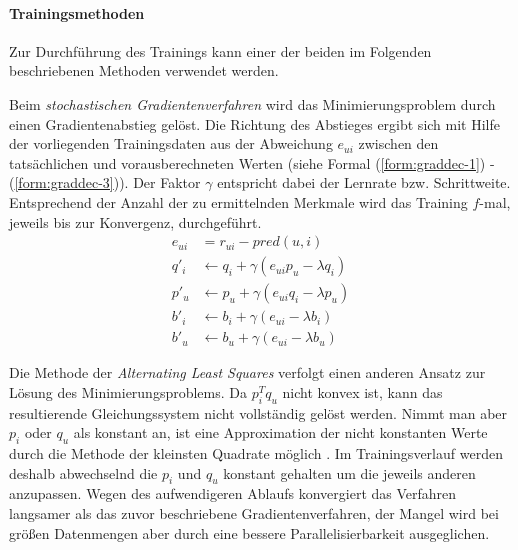 \paragraph{Trainingsmethoden} Zur Durchführung des Trainings kann einer der beiden im Folgenden beschriebenen Methoden verwendet werden.

Beim \textit{stochastischen Gradientenverfahren} \citep{funk2006} wird das Minimierungsproblem durch einen Gradientenabstieg gelöst. Die Richtung des Abstieges  ergibt sich mit Hilfe der vorliegenden Trainingsdaten aus der Abweichung $e_{ui}$ zwischen den tatsächlichen und vorausberechneten Werten (siehe Formal (\ref{form:graddec-1}) - (\ref{form:graddec-3})). Der Faktor $\gamma$ entspricht dabei der Lernrate bzw. Schrittweite. Entsprechend der Anzahl der zu ermittelnden Merkmale wird das Training $f$-mal, jeweils bis zur Konvergenz, durchgeführt. \citep{funk2006,Langford09,hb_05}
\begin{align}
e_{ui} & =  r_{ui} - pred(u,i) \label{form:graddec-1} \\
q'_i & \gets q_i + \gamma (e_{ui} p_u - \lambda q_i ) \label{form:graddec-2} \\
p'_u & \gets p_u + \gamma (e_{ui} q_i - \lambda p_u) \\
b'_i & \gets b_i + \gamma (e_{ui} - \lambda b_i) \\
b'_u & \gets b_u + \gamma (e_{ui} - \lambda b_u) \label{form:graddec-3}
\end{align}

Die Methode der \textit{Alternating Least Squares} \citep{Bell:2007:SCF:1441428.1442050} verfolgt einen anderen Ansatz zur Lösung des Minimierungsproblems. Da $ p_i^T q_u $ nicht konvex ist, kann das resultierende Gleichungssystem nicht vollständig gelöst werden. Nimmt man aber $p_i$ oder $q_u$ als konstant an, ist eine Approximation der nicht konstanten Werte durch die Methode der kleinsten Quadrate möglich . Im Trainingsverlauf werden deshalb abwechselnd die $p_i$ und $q_u$ konstant gehalten um die jeweils anderen anzupassen. Wegen des aufwendigeren Ablaufs konvergiert das Verfahren langsamer als das zuvor beschriebene Gradientenverfahren, der Mangel wird bei größen Datenmengen aber durch eine bessere Parallelisierbarkeit ausgeglichen. \citep{Bell:2007:SCF:1441428.1442050, hb_05}  

